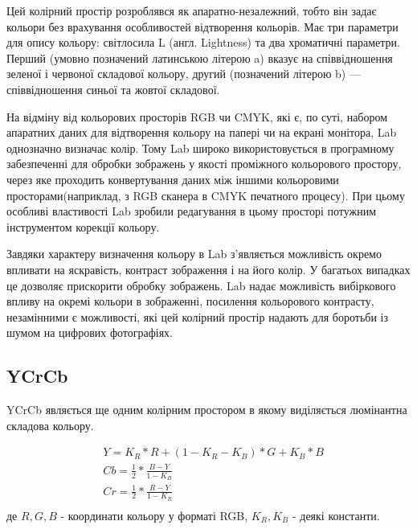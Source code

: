 Цей колірний простір розроблявся як апаратно-незалежний, тобто він задає кольори без врахування особливостей відтворення кольорів. Має три параметри для опису кольору: світлосила L (англ. Lightness) та два хроматичні параметри. Перший (умовно позначений латинською літерою a) вказує на співвідношення зеленої і червоної складової кольору, другий (позначений літерою b) — співвідношення синьої та жовтої складової.

На відміну від кольорових просторів RGB чи CMYK, які є, по суті, набором апаратних даних для відтворення кольору на папері чи на екрані монітора, Lab однозначно визначає колір. Тому Lab широко використовується в програмному забезпеченні для обробки зображень у якості проміжного кольорового простору, через яке проходить конвертування даних між іншими кольоровими просторами(наприклад, з RGB сканера в CMYK печатного процесу). При цьому особливі властивості Lab зробили редагування в цьому просторі потужним інструментом корекції кольору.

Завдяки характеру визначення кольору в Lab з'являється можливість окремо впливати на яскравість, контраст зображення і на його колір. У багатьох випадках це дозволяє прискорити обробку зображень. Lab надає можливість вибіркового впливу на окремі кольори в зображенні, посилення кольорового контрасту, незамінними є можливості, які цей колірний простір надають для боротьби із шумом на цифрових фотографіях.

\subsection{YCrCb}

YCrCb являється ще одним колірним простором в якому виділяється люмінантна складова кольору.

\begin{equation}
	\begin{split}
		&Y  = K_{R}*R + ( 1 - K_{R} - K_{B})*G + K_{B}*B \\
		&Cb = \frac{1}{2}*\frac{B-Y}{1 - K_{B}} \\
		&Cr = \frac{1}{2}*\frac{R-Y}{1 - K_{R}} \\
	\end{split}
	\label{eq:ycrcb_conversion_rgb}
\end{equation}
де $R,G,B$ - координати кольору у форматі RGB, $K_{R},K_{B}$ - деякі константи.

